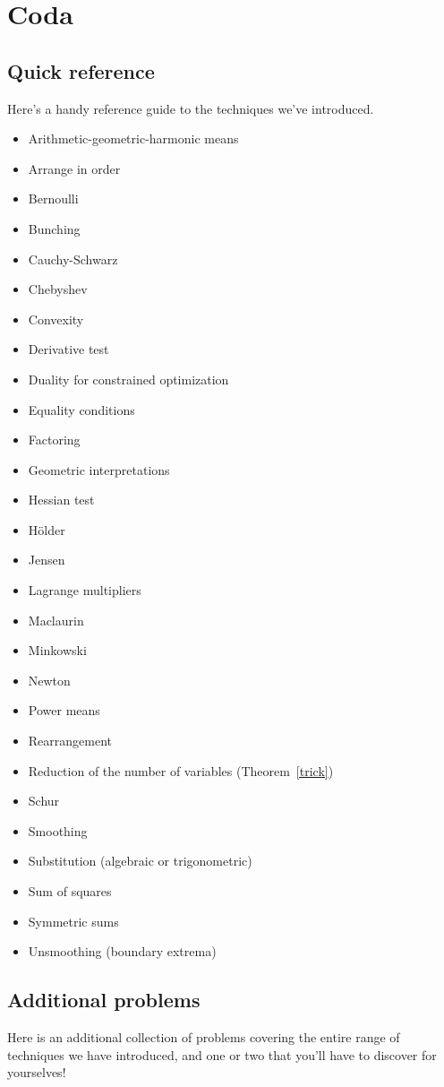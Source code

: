 \documentclass[12pt]{report}
\def\ii{\item}
\numberwithin{exc}{section}
\begin{document}
\chapter{Coda}

\section{Quick reference}
Here's a handy reference guide to the techniques we've introduced. 

\begin{itemize}
\ii Arithmetic-geometric-harmonic means
\ii Arrange in order
\ii Bernoulli
\ii Bunching
\ii Cauchy-Schwarz
\ii Chebyshev
\ii Convexity
\ii Derivative test
\ii Duality for constrained optimization
\ii Equality conditions
\ii Factoring
\ii Geometric interpretations
\ii Hessian test
\ii H\"older
\ii Jensen
\ii Lagrange multipliers
\ii Maclaurin
\ii Minkowski
\ii Newton
\ii Power means 
\ii Rearrangement
\ii Reduction of the number of variables (Theorem~\ref{trick})
\ii Schur
\ii Smoothing
\ii Substitution (algebraic or trigonometric)
\ii Sum of squares
\ii Symmetric sums
\ii Unsmoothing (boundary extrema)
\end{itemize}

\section{Additional problems}
Here is an additional collection of problems covering the entire range
of techniques we have introduced, and one or two that you'll have to
discover for yourselves!
\end{document}
